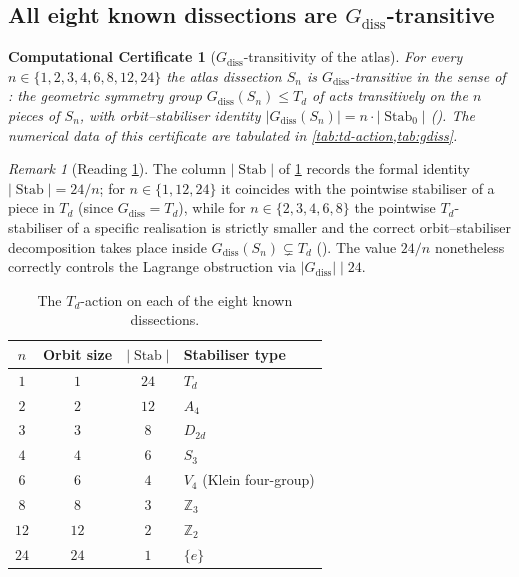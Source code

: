 \documentclass[11pt,a4paper]{article}
\theoremstyle{plain}
\newtheorem{computationalcertificate}[computationalcertificate]{Computational Certificate}
\theoremstyle{definition}
\theoremstyle{remark}
\newtheorem{remark}[remark]{Remark}
\DeclareMathOperator{\Stab}{Stab}
\newcommand{\Td}{T_{\!d}}
\newcommand{\Z}{\mathbb{Z}}
\begin{document}
\subsection{All eight known dissections are $G_{\mathrm{diss}}$-transitive}
\label{ssec:transitivity}

\begin{computationalcertificate}[$G_{\mathrm{diss}}$-transitivity of the atlas]\label{thm:transitivity}
For every $n \in \{1,2,3,4,6,8,12,24\}$ the atlas dissection $S_{n}$ is
$G_{\mathrm{diss}}$-transitive in the sense of
: the geometric symmetry group
$G_{\mathrm{diss}}(S_{n}) \leq \Td$ of  acts transitively on
the $n$ pieces of $S_{n}$, with orbit--stabiliser identity
$|G_{\mathrm{diss}}(S_{n})| = n \cdot |\Stab_{0}|$
().  The numerical data of this certificate are
tabulated in \cref{tab:td-action,tab:gdiss}.
\end{computationalcertificate}

\begin{remark}[Reading \cref{tab:td-action}]\label{rem:type-vs-invariance}
The column $|\Stab|$ of \cref{tab:td-action} records the formal identity
$|\Stab| = 24/n$; for $n \in \{1,12,24\}$ it coincides with the
pointwise stabiliser of a piece in $\Td$ (since $G_{\mathrm{diss}} = \Td$),
while for $n \in \{2,3,4,6,8\}$ the pointwise $\Td$-stabiliser of a
specific realisation is strictly smaller and the correct orbit--stabiliser
decomposition takes place inside $G_{\mathrm{diss}}(S_{n}) \subsetneq \Td$
().  The value $24/n$ nonetheless correctly
controls the Lagrange obstruction via $|G_{\mathrm{diss}}| \mid 24$.
\end{remark}

\begin{table}[H]
\centering\small
\caption{The $\Td$-action on each of the eight known dissections.}
\label{tab:td-action}
\begin{tabular}{@{}c c c l@{}}
\toprule
$n$ & Orbit size & $|\Stab|$ & Stabiliser type \\
\midrule
$1$  & $1$  & $24$ & $\Td$ \\
$2$  & $2$  & $12$ & $A_{4}$ \\
$3$  & $3$  & $8$  & $D_{2d}$ \\
$4$  & $4$  & $6$  & $S_{3}$ \\
$6$  & $6$  & $4$  & $V_{4}$ (Klein four-group) \\
$8$  & $8$  & $3$  & $\Z_{3}$ \\
$12$ & $12$ & $2$  & $\Z_{2}$ \\
$24$ & $24$ & $1$  & $\{e\}$ \\
\bottomrule
\end{tabular}
\end{table}
\end{document}
